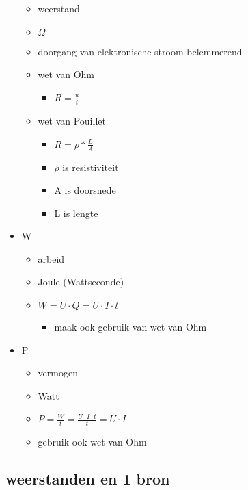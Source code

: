 \documentclass[11pt]{article}
\let\originalitem\item
\renewcommand{\item}{\originalitem[]}
\newcommand{\Newpage}{\end{preview}\begin{preview}}
\begin{document}
\begin{preview}
\begin{itemize}
	\begin{itemize}
		\item weerstand
		\item $\Omega$
		\item doorgang van elektronische stroom belemmerend
		\item wet van Ohm
		\begin{itemize}
			\item $R=\frac{u}{i}$
		\end{itemize}
		\item wet van Pouillet
		\begin{itemize}
			\item $R = \rho * \frac{L}{A}$
			\item $\rho$ is resistiviteit
			\item A is doorsnede
			\item L is lengte
		\end{itemize}
	\end{itemize}
\item W
	\begin{itemize}
		\item arbeid
		\item Joule (Wattseconde)
		\item $W=U \cdot Q=U\cdot I \cdot t$
		\begin{itemize}
			\item maak ook gebruik van wet van Ohm
		\end{itemize}
	\end{itemize}
\item P
	\begin{itemize}
		\item vermogen
		\item Watt
		\item $P=\frac{W}{t}=\frac{U \cdot I \cdot t}{t} = U \cdot I$
		\item gebruik ook wet van Ohm 
	\end{itemize}
\end{itemize}

\Newpage
\section{weerstanden en 1 bron}


\end{preview}
\end{document}
